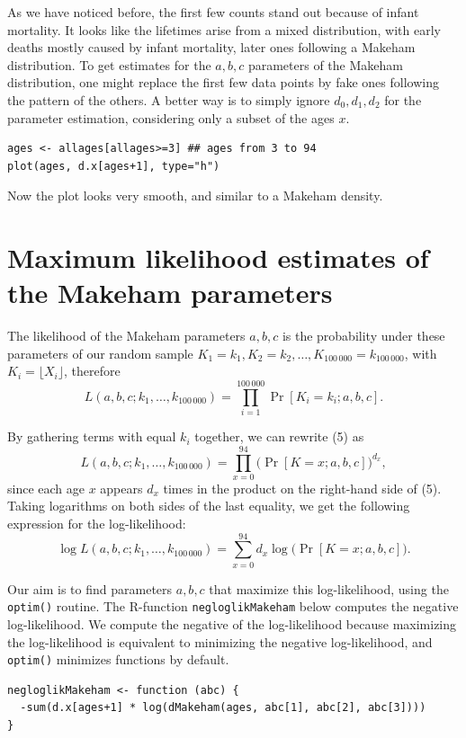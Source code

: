 \documentclass{article}
\begin{document}
\begin{enumerate}
As we have noticed before, the first few counts stand out because of infant mortality. It looks like the lifetimes arise from a mixed distribution, with early deaths mostly caused by infant mortality, later ones following a Makeham distribution. To get estimates for the $a, b, c$ parameters of the Makeham distribution, one might replace the first few data points by fake ones following the pattern of the others. A better way is to simply ignore $d_0, d_1, d_2$ for the parameter estimation, considering only a subset of the ages $x$.
\begin{verbatim}
ages <- allages[allages>=3] ## ages from 3 to 94
plot(ages, d.x[ages+1], type="h")
\end{verbatim}
Now the plot looks very smooth, and similar to a Makeham density.

\section{Maximum likelihood estimates of the Makeham parameters}

The likelihood of the Makeham parameters $a, b, c$ is the probability under these parameters of our random sample $K_1 = k_1, K_2 = k_2, \ldots, K_{100\,000} = k_{100\,000}$, with $K_i = \lfloor X_i \rfloor$, therefore
\begin{equation}
L(a, b, c; k_1, \ldots, k_{100\,000}) = \prod_{i=1}^{100\,000} \Pr[K_i = k_i; a, b, c].
\end{equation}

By gathering terms with equal $k_i$ together, we can rewrite (5) as
\[
L(a, b, c; k_1, \ldots, k_{100\,000}) = \prod_{x=0}^{94} \bigl(\Pr[K = x; a, b, c]\bigr)^{d_x},
\]
since each age $x$ appears $d_x$ times in the product on the right-hand side of (5). Taking logarithms on both sides of the last equality, we get the following expression for the log-likelihood:
\[
\log L(a, b, c; k_1, \ldots, k_{100\,000}) = \sum_{x=0}^{94} d_x \log\bigl(\Pr[K = x; a, b, c]\bigr).
\]

Our aim is to find parameters $a, b, c$ that maximize this log-likelihood, using the \texttt{optim()} routine. The R-function \texttt{negloglikMakeham} below computes the negative log-likelihood. We compute the negative of the log-likelihood because maximizing the log-likelihood is equivalent to minimizing the negative log-likelihood, and \texttt{optim()} minimizes functions by default.

\begin{verbatim}
negloglikMakeham <- function (abc) {
  -sum(d.x[ages+1] * log(dMakeham(ages, abc[1], abc[2], abc[3])))
}
\end{verbatim}


\end{enumerate}
\end{document}
